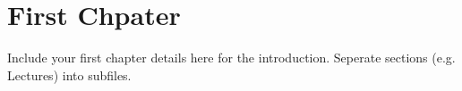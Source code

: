 \documentclass[../notes.tex]{subfile}
\begin{document}
\chapter[First Chpater]{First Chpater}\label{chap:First Chpater}

Include your first chapter details  here for the introduction. Seperate sections (e.g. Lectures) into subfiles. 


\end{document}

